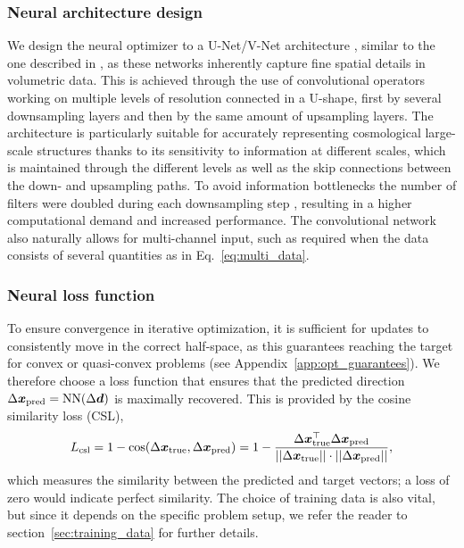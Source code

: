 \subsubsection{Neural architecture design}
We design the neural optimizer to a U-Net/V-Net architecture \citep{Ronneberger,Milletari2016}, similar to the one described in \citet{Jamieson2022b}, as these networks inherently capture fine spatial details in volumetric data. This is achieved through the use of convolutional operators working on multiple levels of resolution connected in a U-shape, first by several downsampling layers and then by the same amount of upsampling layers. The architecture is particularly suitable for accurately representing cosmological large-scale structures thanks to its sensitivity to information at different scales, which is maintained through the different levels as well as the skip connections between the down- and upsampling paths. To avoid information bottlenecks the number of filters were doubled during each downsampling step \citep{Szegedy2016,Ibtehaz2020}, resulting in a higher computational demand and increased performance. The convolutional network also naturally allows for multi-channel input, such as required when the data consists of several quantities as in Eq.~\eqref{eq:multi_data}. 

\subsubsection{Neural loss function}
To ensure convergence in iterative optimization, it is sufficient for updates to consistently move in the correct half-space, as this guarantees reaching the target for convex or quasi-convex problems (see Appendix~\ref{app:opt_guarantees}). We therefore choose a loss function that ensures that the predicted direction $\Delta \boldsymbol{x}_{\mathrm{pred}}=\mathrm{NN}(\Delta \boldsymbol{d})$ is maximally recovered. This is provided by the cosine similarity loss (CSL),
\begin{equation}
L_{\mathrm{csl}} = 1 - \cos(\Delta \boldsymbol{x}_{\mathrm{true}}, \Delta \boldsymbol{x}_{\mathrm{pred}}) = 1 - \frac{\Delta \boldsymbol{x}_{\mathrm{true}}^\top \Delta \boldsymbol{x}_{\mathrm{pred}}}{||\Delta \boldsymbol{x}_{\mathrm{true}}|| \cdot ||\Delta \boldsymbol{x}_{\mathrm{pred}}||},
\label{eq:cossim}
\end{equation}
which measures the similarity between the predicted and target vectors; a loss of zero would indicate perfect similarity. The choice of training data is also vital, but since it depends on the specific problem setup, we refer the reader to section~\ref{sec:training_data} for further details.

